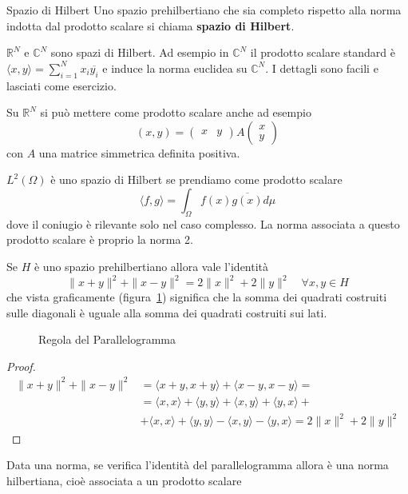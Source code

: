 \begin{definition}{Spazio di Hilbert}
    Uno spazio prehilbertiano che sia completo rispetto alla norma indotta dal
    prodotto scalare si chiama \textbf{spazio di Hilbert}.
\end{definition}
\begin{example}
    \(\mathbb{R}^{N}\) e \(\mathbb{C}^{N}\) sono spazi di Hilbert. Ad esempio in
    \(\mathbb{C}^{N}\) il prodotto scalare standard è \(\langle x, y \rangle =
    \sum_{i=1}^{N} x_{i} \overline{y_{i}}\) e induce la norma euclidea su
    \(\mathbb{C}^{N}\). I dettagli sono facili e lasciati come esercizio.

    Su \(\mathbb{R}^{N}\) si può mettere come prodotto scalare anche ad esempio
    \[
        {(x, y)} = \begin{pmatrix}
            x & y
        \end{pmatrix} A \begin{pmatrix}
            x \\ y
        \end{pmatrix}
    \]
    con \(A\) una matrice simmetrica definita positiva.
\end{example}
\begin{example}
    \(L^{2}{(\Omega)}\) è uno spazio di Hilbert se prendiamo come prodotto
    scalare 
    \[
        \langle f, g \rangle = \int_{\Omega} f(x) \overline{g(x)} d\mu
    \]
    dove il coniugio è rilevante solo nel caso complesso. La norma associata a
    questo prodotto scalare è proprio la norma 2.
\end{example}
\begin{proposition}\label{prop:parallelogramma}
    Se \(H\) è uno spazio prehilbertiano allora vale l'identità
    \[
        \|x + y\|^2 + \|x - y\|^2 = 2\|x\|^2 + 2\|y\|^2 \quad \forall x, y \in H
    \]
    che vista graficamente (figura~\ref{fig:parallelogramma}) significa che la somma dei quadrati costruiti
    sulle diagonali è uguale alla somma dei quadrati costruiti sui lati.
\end{proposition}
\begin{figure}[ht]
    \centering
    \caption{Regola del Parallelogramma}\label{fig:parallelogramma}
\end{figure}
\begin{proof}
    \begin{align*}
        \|x+y\|^2 + \|x-y\|^2 &= \langle x+y, x+y \rangle + \langle x-y, x-y
        \rangle = \\ &= \langle x, x \rangle + \langle y, y \rangle + \langle x, y
        \rangle + \langle y, x \rangle + \\ &+ \langle x, x \rangle + \langle y, y
        \rangle - \langle x, y \rangle - \langle y, x \rangle = 2\|x\|^2 +
        2\|y\|^2
    \end{align*}
\end{proof}
    Data una norma, se  verifica l'identità del parallelogramma allora
     è una norma hilbertiana, cioè associata a un prodotto scalare

